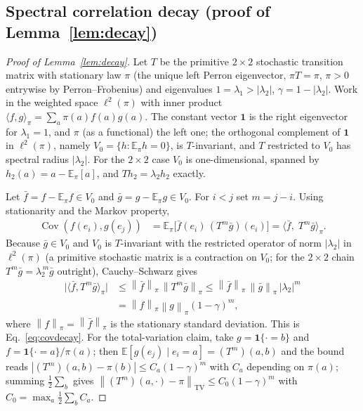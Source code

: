 \documentclass[reprint,aps,prxquantum,amsmath,amssymb,floatfix,nofootinbib,longbibliography]{revtex4-2}
\theoremstyle{definition}
\theoremstyle{remark}
\theoremstyle{plain}
\newcommand{\E}{\mathbb{E}}
\newcommand{\Cov}{\operatorname{Cov}}
\newcommand{\norm}[1]{\left\lVert #1 \right\rVert}
\newcommand{\abs}[1]{\left\lvert #1 \right\rvert}
\begin{document}
\subsection{Spectral correlation decay (proof of Lemma~\ref{lem:decay})}
\label{app:decay}

\begin{proof}[Proof of Lemma~\ref{lem:decay}]
Let $T$ be the primitive $2\times2$ stochastic transition matrix with
stationary law $\pi$ (the unique left Perron eigenvector,
$\pi T=\pi$, $\pi>0$ entrywise by Perron--Frobenius) and eigenvalues
$1=\lambda_1>\abs{\lambda_2}$, $\gamma=1-\abs{\lambda_2}$. Work in the weighted
space $\ell^2(\pi)$ with inner product $\langle f,g\rangle_\pi=\sum_a\pi(a)f(a)g(a)$.
The constant vector $\mathbf 1$ is the right eigenvector for $\lambda_1=1$, and
$\pi$ (as a functional) the left one; the orthogonal complement of $\mathbf 1$
in $\ell^2(\pi)$, namely $V_0=\{h:\E_\pi h=0\}$, is $T$-invariant, and $T$
restricted to $V_0$ has spectral radius $\abs{\lambda_2}$. For the $2\times2$
case $V_0$ is one-dimensional, spanned by $h_2(a)=a-\E_\pi[a]$, and
$Th_2=\lambda_2 h_2$ exactly.

Let $\bar f=f-\E_\pi f\in V_0$ and $\bar g=g-\E_\pi g\in V_0$. For $i<j$ set
$m=j-i$. Using stationarity and the Markov property,
\begin{align}
  \Cov(f(e_i),g(e_j))
   &=\E_\pi\bigl[\bar f(e_i)\,(T^m\bar g)(e_i)\bigr]
    =\langle \bar f,\;T^m\bar g\rangle_\pi .
\end{align}
Because $\bar g\in V_0$ and $V_0$ is $T$-invariant with the restricted operator
of norm $\abs{\lambda_2}$ in $\ell^2(\pi)$ (a primitive stochastic matrix is a
contraction on $V_0$; for the $2\times2$ chain $T^m\bar g=\lambda_2^{\,m}\bar g$
outright), Cauchy--Schwarz gives
\begin{equation}
  \begin{split}
  \bigl|\langle\bar f,T^m\bar g\rangle_\pi\bigr|
   &\le\norm{\bar f}_\pi\,\norm{T^m\bar g}_\pi
    \le\norm{\bar f}_\pi\,\norm{\bar g}_\pi\,\abs{\lambda_2}^{m}\\
   &=\norm{f}_\pi\norm{g}_\pi(1-\gamma)^{m},
  \end{split}
\end{equation}
where $\norm{f}_\pi=\norm{\bar f}_\pi$ is the stationary standard deviation.
This is Eq.~\eqref{eq:covdecay}. For the total-variation claim, take
$g=\mathbf 1\{\cdot=b\}$ and $f=\mathbf 1\{\cdot=a\}/\pi(a)$; then
$\E[g(e_j)\mid e_i=a]=(T^m)(a,b)$ and the bound reads
$\abs{(T^m)(a,b)-\pi(b)}\le C_{a}(1-\gamma)^m$ with $C_a$ depending on $\pi(a)$;
summing $\tfrac12\sum_b$ gives
$\norm{(T^m)(a,\cdot)-\pi}_{\mathrm{TV}}\le C_0(1-\gamma)^m$ with
$C_0=\max_a\tfrac12\sum_bC_a$.
\end{proof}
\end{document}
